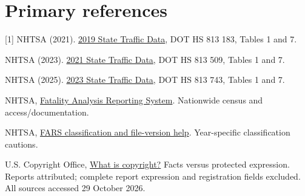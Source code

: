\documentclass[10pt,letterpaper]{article}
\begin{document}
\section*{Primary references}
\small
[1] NHTSA (2021). \href{https://crashstats.nhtsa.dot.gov/Api/Public/ViewPublication/813183}{2019 State Traffic Data}, DOT HS 813 183, Tables 1 and 7.\par
[2] NHTSA (2023). \href{https://crashstats.nhtsa.dot.gov/Api/Public/ViewPublication/813509}{2021 State Traffic Data}, DOT HS 813 509, Tables 1 and 7.\par
[3] NHTSA (2025). \href{https://crashstats.nhtsa.dot.gov/Api/Public/ViewPublication/813743}{2023 State Traffic Data}, DOT HS 813 743, Tables 1 and 7.\par
[4] NHTSA, \href{https://www.nhtsa.gov/research-data/fatality-analysis-reporting-system-fars}{Fatality Analysis Reporting System}. Nationwide census and access/documentation.\par
[5] NHTSA, \href{https://www-fars.nhtsa.dot.gov/Help/helplinks.aspx}{FARS classification and file-version help}. Year-specific classification cautions.\par
[6] U.S. Copyright Office, \href{https://www.copyright.gov/what-is-copyright/}{What is copyright?} Facts versus protected expression. Reports attributed; complete report expression and registration fields excluded. All sources accessed 29 October 2026.
\end{document}
